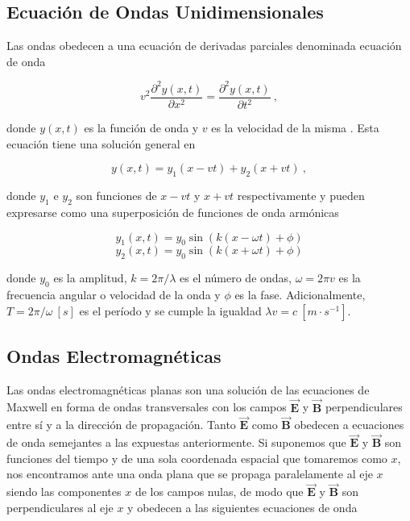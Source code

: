 \documentclass{tufte-handout}
\begin{document}
\subsection{Ecuación de Ondas Unidimensionales}

Las ondas obedecen a una ecuación de derivadas parciales denominada ecuación de onda

\begin{equation}
v^2 \displaystyle\frac{\partial^2 y(x,t)}{\partial x^2} = \displaystyle\frac{\partial^2 y(x,t)}{\partial t^2}~,
\end{equation}

donde $y(x,t)$ es la función de onda y $v$ es la velocidad de la misma . Esta ecuación tiene una solución general en

\begin{equation}
y(x,t) = y_1(x - vt) + y_2(x + vt)~,
\end{equation}

donde $y_1$ e $y_2$ son funciones de $x-vt$ y $x+vt$ respectivamente y pueden expresarse como una superposición de funciones de onda armónicas

\begin{equation}
y_1(x,t) = y_0 \sin{(k(x - \omega t) + \phi)}
\end{equation}
\begin{equation}
y_2(x,t) = y_0 \sin{(k(x + \omega t) + \phi)}
\end{equation}

donde $y_0$ es la amplitud, $k = 2\pi / \lambda$ es el número de ondas, $\omega = 2\pi v$ es la frecuencia angular o velocidad de la onda y $\phi$ es la fase. Adicionalmente, $T = 2\pi/\omega~[s]$ es el período y se cumple la igualdad $\lambda v = c ~ [m\cdot s^{-1}]$.

\subsection{Ondas Electromagnéticas}

Las ondas electromagnéticas planas son una solución de las ecuaciones de Maxwell en forma de ondas transversales con los campos $\mathbf{\vec{E}}$ y $\mathbf{\vec{B}}$ perpendiculares entre sí y a la dirección de propagación. Tanto $\mathbf{\vec{E}}$ como $\mathbf{\vec{B}}$ obedecen a ecuaciones de onda semejantes a las expuestas anteriormente. Si suponemos que $\mathbf{\vec{E}}$ y $\mathbf{\vec{B}}$ son funciones del tiempo y de una sola coordenada espacial que tomaremos como $x$, nos encontramos ante una onda plana que se propaga paralelamente al eje $x$ siendo las componentes $x$ de los campos nulas, de modo que $\mathbf{\vec{E}}$ y $\mathbf{\vec{B}}$ son perpendiculares al eje $x$ y obedecen a las siguientes ecuaciones de onda
\end{document}
